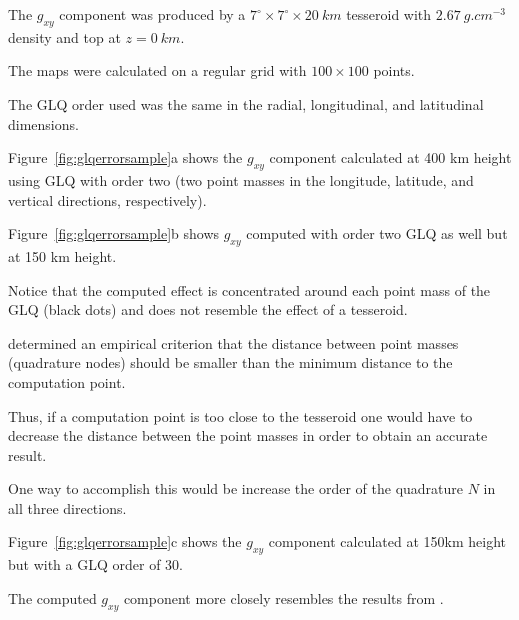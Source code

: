 \documentclass[paper,twocolumn]{geophysics}
\begin{document}
The $g_{xy}$ component was produced by a
$7^\circ \times 7^\circ \times 20\ km$ tesseroid
with $2.67\ g.cm^{-3}$ density
and top at $z=0\ km$.

The maps were calculated on a regular grid
with $100\times100$ points.

The GLQ order used was the same
in the radial, longitudinal, and latitudinal dimensions.

Figure~\ref{fig:glqerrorsample}a shows the $g_{xy}$ component
calculated at 400 km height using
GLQ with order two (two point masses in the longitude, latitude, and vertical
directions, respectively).

Figure~\ref{fig:glqerrorsample}b shows $g_{xy}$ computed with order two
GLQ as well but at 150 km height.

Notice that the computed effect is concentrated around each point mass
of the GLQ (black dots) and does not resemble the effect of a tesseroid.

\citet{Ku1977} determined an empirical criterion that the distance between
point masses (quadrature nodes) should be smaller than the minimum distance to
the computation point.

Thus, if a computation point is too close to the tesseroid one would have to
decrease the distance between the point masses in order to obtain an accurate
result.

One way to accomplish this would be increase the order of the quadrature
$N$ in all three directions.

Figure~\ref{fig:glqerrorsample}c shows the $g_{xy}$ component calculated at
150km height but with a GLQ order of 30.

The computed $g_{xy}$ component more closely resembles the results from
\citet{Asgharzadeh2007}.
\end{document}
